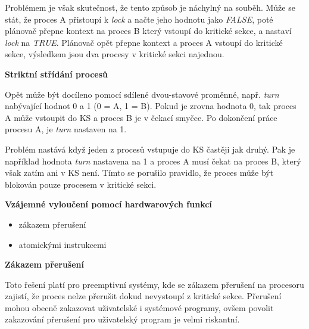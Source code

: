 \vspace{0,5cm}

Problémem je však skutečnost, že tento způsob je náchylný na souběh. Může se stát, že proces A přistoupí k \textit{lock} a načte jeho hodnotu jako \textit{FALSE}, poté plánovač přepne kontext na proces B který vstoupí do kritické sekce, a nastaví \textit{lock} na \textit{TRUE}.  Plánovač opět přepne kontext a proces A vstoupí do kritické sekce, výsledkem jsou dva procesy v kritické sekci najednou. 

\begin{large}
    \vspace{0,5cm}
    \textbf{Striktní střídání procesů}
\end{large}

Opět může být docíleno pomocí sdílené dvou-stavové proměnné, např. \textit{turn} nabývající hodnot 0 a 1 (0 = A, 1 = B). Pokud je zrovna hodnota 0, tak proces A může vstoupit do KS a proces B je v čekací smyčce. Po dokončení práce procesu A, je \textit{turn} nastaven na 1.

\vspace{0,5cm}

Problém nastává když jeden z procesů vstupuje do KS častěji jak druhý. Pak je například hodnota \textit{turn} nastavena na 1 a proces A musí čekat na proces B, který však zatím ani v KS není. Tímto se porušilo pravidlo, že proces může být blokován pouze procesem v kritické sekci. 

\begin{large}
    \vspace{0,5cm}
    \textbf{Vzájemné vyloučení pomocí hardwarových funkcí}    
\end{large}

\begin{itemize}
    \item zákazem přerušení
    \item atomickými instrukcemi
\end{itemize}

\begin{large}
    \vspace{0,5cm}
    \textbf{Zákazem přerušení}    
\end{large}

Toto řešení platí pro preemptivní systémy, kde se zákazem přerušení na procesoru zajistí, že proces nelze přerušit dokud nevystoupí z kritické sekce. Přerušení mohou obecně zakazovat uživatelské i systémové programy, ovšem povolit zakazování přerušení pro uživatelský program je velmi riskantní. 

